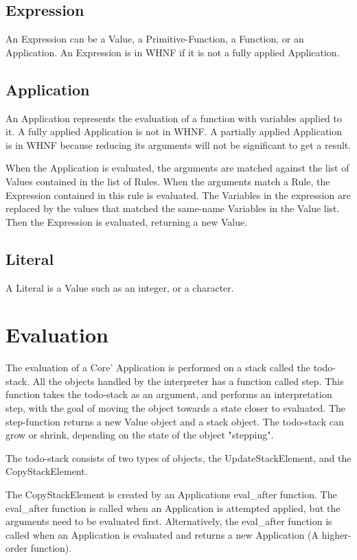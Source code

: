 \subsection*{Expression}
An Expression can be a Value, a Primitive-Function, a Function, or an Application.
An Expression is in WHNF if it is not a fully applied Application.

\subsection*{Application}
An Application represents the evaluation of a function with variables applied to it.
A fully applied Application is not in WHNF. A partially applied Application is in 
WHNF because reducing its arguments will not be significant to get a result.

When the Application is evaluated, the arguments are matched against the list of 
Values contained in the list of Rules. 
When the arguments match a Rule, the Expression contained in this rule is evaluated. 
The Variables in the expression are replaced by the values that matched the same-name
Variables in the Value list. Then the Expression is evaluated, returning a new Value.

\subsection*{Literal}
A Literal is a Value such as an integer, or a character.





\section{Evaluation}

The evaluation of a Core' Application is performed on a stack called the
todo-stack. All the objects handled by the interpreter has a function called
step. This function takes the todo-stack as an argument, and performs an
interpretation step, with the goal of moving the object towards a state
closer to evaluated. The step-function returns a new Value object and a
stack object. The todo-stack can grow or shrink, depending on the state of
the object "stepping".

The todo-stack consists of two types of objects, the UpdateStackElement,
and the CopyStackElement. 

The CopyStackElement is created by an Applications eval\_after function. The
eval\_after function is called when an Application is attempted applied, but
the arguments need to be evaluated first. Alternatively, the eval\_after
function is called when an Application is evaluated and returns a new
Application (A higher-order function). 

